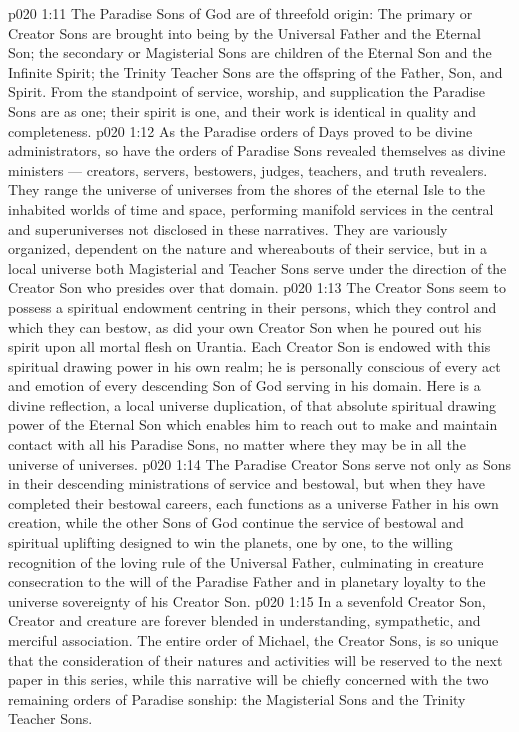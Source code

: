 \vs p020 1:11 \pc The Paradise Sons of God are of threefold origin: The primary or Creator Sons are brought into being by the Universal Father and the Eternal Son; the secondary or Magisterial Sons are children of the Eternal Son and the Infinite Spirit; the Trinity Teacher Sons are the offspring of the Father, Son, and Spirit. From the standpoint of service, worship, and supplication the Paradise Sons are as one; their spirit is one, and their work is identical in quality and completeness.
\vs p020 1:12 As the Paradise orders of Days proved to be divine administrators, so have the orders of Paradise Sons revealed themselves as divine ministers --- creators, servers, bestowers, judges, teachers, and truth revealers. They range the universe of universes from the shores of the eternal Isle to the inhabited worlds of time and space, performing manifold services in the central and superuniverses not disclosed in these narratives. They are variously organized, dependent on the nature and whereabouts of their service, but in a local universe both Magisterial and Teacher Sons serve under the direction of the Creator Son who presides over that domain.
\vs p020 1:13 The Creator Sons seem to possess a spiritual endowment centring in their persons, which they control and which they can bestow, as did your own Creator Son when he poured out his spirit upon all mortal flesh on Urantia. Each Creator Son is endowed with this spiritual drawing power in his own realm; he is personally conscious of every act and emotion of every descending Son of God serving in his domain. Here is a divine reflection, a local universe duplication, of that absolute spiritual drawing power of the Eternal Son which enables him to reach out to make and maintain contact with all his Paradise Sons, no matter where they may be in all the universe of universes.
\vs p020 1:14 The Paradise Creator Sons serve not only as Sons in their descending ministrations of service and bestowal, but when they have completed their bestowal careers, each functions as a universe Father in his own creation, while the other Sons of God continue the service of bestowal and spiritual uplifting designed to win the planets, one by one, to the willing recognition of the loving rule of the Universal Father, culminating in creature consecration to the will of the Paradise Father and in planetary loyalty to the universe sovereignty of his Creator Son.
\vs p020 1:15 In a sevenfold Creator Son, Creator and creature are forever blended in understanding, sympathetic, and merciful association. The entire order of Michael, the Creator Sons, is so unique that the consideration of their natures and activities will be reserved to the next paper in this series, while this narrative will be chiefly concerned with the two remaining orders of Paradise sonship: the Magisterial Sons and the Trinity Teacher Sons.
